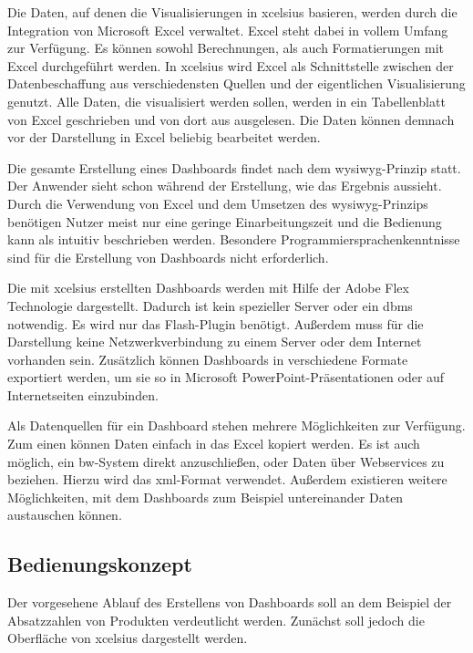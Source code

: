 \begin{onehalfspacing}
Die Daten, auf denen die Visualisierungen in \gls{xcelsius} basieren, werden durch die Integration von Microsoft Excel verwaltet. Excel steht dabei in vollem Umfang zur Verfügung. Es können sowohl Berechnungen, als auch Formatierungen mit Excel durchgeführt werden. In \gls{xcelsius} wird Excel als Schnittstelle zwischen der Datenbeschaffung aus verschiedensten Quellen und der eigentlichen Visualisierung genutzt. Alle Daten, die visualisiert werden sollen, werden in ein Tabellenblatt von Excel geschrieben und von dort aus ausgelesen. Die Daten können demnach vor der Darstellung in Excel beliebig bearbeitet werden. 

Die gesamte Erstellung eines Dashboards findet nach dem \gls{wysiwyg}-Prinzip statt. Der Anwender sieht schon während der Erstellung, wie das Ergebnis aussieht. Durch die Verwendung von Excel und dem Umsetzen des \gls{wysiwyg}-Prinzips benötigen Nutzer meist nur eine geringe Einarbeitungszeit und die Bedienung kann als intuitiv beschrieben werden. Besondere Programmiersprachenkenntnisse sind für die Erstellung von Dashboards nicht erforderlich.

Die mit \gls{xcelsius} erstellten Dashboards werden mit Hilfe der Adobe Flex Technologie dargestellt. Dadurch ist kein spezieller Server oder ein \gls{dbms} notwendig. Es wird nur das Flash-Plugin benötigt. Außerdem muss für die Darstellung keine Netzwerkverbindung zu einem Server oder dem Internet vorhanden sein. Zusätzlich können Dashboards in verschiedene Formate exportiert werden, um sie so in Microsoft PowerPoint-Präsentationen oder auf Internetseiten einzubinden.

Als Datenquellen für ein Dashboard stehen mehrere Möglichkeiten zur Verfügung. Zum einen können Daten einfach in das Excel kopiert werden. Es ist auch möglich, ein \gls{bw}-System direkt anzuschließen, oder Daten über Webservices zu beziehen. Hierzu wird das \gls{xml}-Format verwendet. Außerdem existieren weitere Möglichkeiten, mit dem Dashboards zum Beispiel untereinander Daten austauschen können.

\subsection{Bedienungskonzept}
Der vorgesehene Ablauf des Erstellens von Dashboards soll an dem Beispiel der Absatzzahlen von Produkten verdeutlicht werden. Zunächst soll jedoch die Oberfläche von \gls{xcelsius} dargestellt werden.


\end{onehalfspacing}
